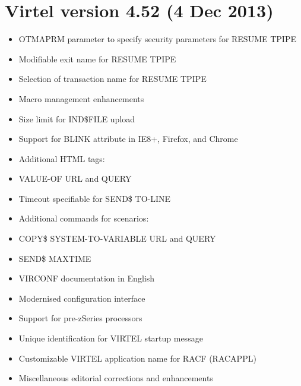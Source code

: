 \documentclass[letterpaper,10pt,english]{sphinxmanual}
\begin{document}
\section{Virtel version 4.52 (4 Dec 2013)}
\label{\detokenize{Installation_Guide:virtel-version-4-52-4-dec-2013}}
\begin{itemize}
\item {} 
OTMAPRM parameter to specify security parameters for RESUME TPIPE

\item {} 
Modifiable exit name for RESUME TPIPE

\item {} 
Selection of transaction name for RESUME TPIPE

\end{itemize}

\begin{itemize}
\item {} 
Macro management enhancements

\item {} 
Size limit for IND\$FILE upload

\item {} 
Support for BLINK attribute in IE8+, Firefox, and Chrome

\item {} 
Additional HTML tags:

\item {} 
VALUE-OF URL and QUERY

\end{itemize}

\begin{itemize}
\item {} 
Timeout specifiable for SEND\$ TO-LINE

\item {} 
Additional commands for scenarios:

\item {} 
COPY\$ SYSTEM-TO-VARIABLE URL and QUERY

\item {} 
SEND\$ MAXTIME

\end{itemize}

\begin{itemize}
\item {} 
VIRCONF documentation in English

\item {} 
Modernised configuration interface

\item {} 
Support for pre-zSeries processors

\item {} 
Unique identification for VIRTEL startup message

\item {} 
Customizable VIRTEL application name for RACF (RACAPPL)

\item {} 
Miscellaneous editorial corrections and enhancements

\end{itemize}
\end{document}
